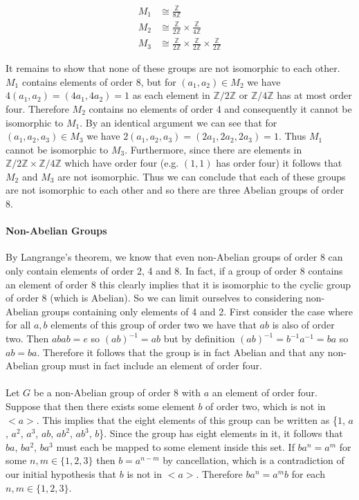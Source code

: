 \documentclass{article}
\begin{document}
\begin{align*}
	M_1 &\cong \frac{\mathbb{Z}}{8\mathbb{Z}} \\
	M_2 &\cong \frac{\mathbb{Z}}{2\mathbb{Z}}\times\frac{\mathbb{Z}}{4\mathbb{Z}} \\
	M_3 &\cong \frac{\mathbb{Z}}{2\mathbb{Z}}\times \frac{\mathbb{Z}}{2\mathbb{Z}} \times \frac{\mathbb{Z}}{2\mathbb{Z}}
\end{align*}

It remains to show that none of these groups are not isomorphic to each other. $M_1$ contains 
elements of order 8, but for $(a_1,a_2) \in M_2$ we have $4(a_1,a_2) = (4a_1,4a_2) = 1$ as each 
element in $\mathbb{Z}/2\mathbb{Z}$ or $\mathbb{Z}/4\mathbb{Z}$ has at most order four. Therefore 
$M_2$ contains no elements of order 4 and consequently it cannot be isomorphic to $M_1$. By an 
identical argument we can see that for $(a_1,a_2,a_3) \in M_3$ we have $2(a_1,a_2,a_3) = (2a_1,2a_2,2a_3) = 1$. 
Thus $M_1$ cannot be isomorphic to $M_3$. Furthermore, since there are elements in $\mathbb{Z}/2\mathbb{Z} \times \mathbb{Z}/4\mathbb{Z}$ 
which have order four (e.g. $(1,1)$ has order four) it follows that $M_2$ and $M_3$ are not isomorphic. 
Thus we can conclude that each of these groups are not isomorphic to each other and so there are 
three Abelian groups of order 8. 

\paragraph{Non-Abelian Groups}
By Langrange's theorem, we know that even non-Abelian groups of order 8 can only contain elements of order 
2, 4 and 8. In fact, if a group of order 8 contains an element of order 8 this clearly implies that 
it is isomorphic to the cyclic group of order 8 (which is Abelian). So we can limit ourselves to 
considering non-Abelian groups containing only elements of 4 and 2. First consider the case 
where for all $a,b$ elements of this group of order two we have that $ab$ is also of order two. Then $abab = e$ so $(ab)^{-1} = ab$ but 
by definition $(ab)^{-1} = b^{-1}a^{-1} = ba$ so $ab = ba$. Therefore it follows that the group 
is in fact Abelian and that any non-Abelian group must in fact include an element of order four. 

\paragraph{}
Let $G$ be a non-Abelian group of order 8 with $a$ an element of order four. Suppose 
that then there exists some element $b$ of order two, which is not in $<a>$. This implies that the 
eight elements of this group can be written as \{$1$, $a$, $a^2$, $a^3$, $ab$, $ab^2$, $ab^3$, $b$\}. Since 
the group has eight elements in it, it follows that $ba$, $ba^2$, $ba^3$ 
must each be mapped to some element inside this set. If $ba^n = a^m$ for some $n,m \in \{1,2,3\}$ 
then $b = a^{n-m}$ by cancellation, which is a contradiction of our initial hypothesis that $b$ 
is not in $<a>$. Therefore $ba^n = a^mb$ for each $n,m \in \{1,2,3\}$.
\end{document}
